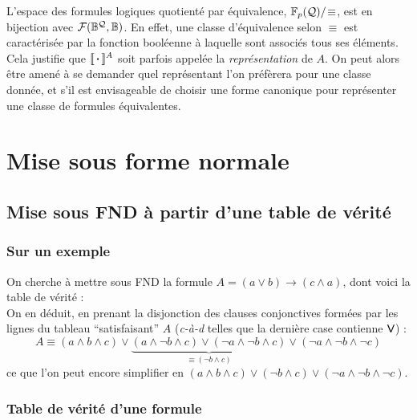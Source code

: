		L'espace des formules logiques quotienté par équivalence, \(\FpQ/\!\equiv\), est en bijection avec \(\cal{F}(\bb{B}^\cal{Q},\bb{B})\). En effet, une classe d'équivalence selon \(\equiv\) est caractérisée par la fonction booléenne à laquelle sont associés tous ses éléments.
			\nt
		Cela justifie que \(\llbracket \text{\! \bdot \!} \rrbracket^A\) soit parfois appelée la \emph{représentation} de \(A\).
			\nll
		On peut alors être amené à se demander quel représentant l'on préfèrera pour une classe donnée, et s'il est envisageable de choisir une forme canonique pour représenter une classe de formules équivalentes.
		
\section{Mise sous forme normale}

	\subsection{Mise sous FND à partir d'une table de vérité}
	
		\subsubsection{Sur un exemple}
			
			\eqskip{2mm}
			On cherche à mettre sous FND la formule \(A = (a \vee b) \rightarrow (c \wedge a)\), dont voici la table de vérité : \\[60mm]
			On en déduit, en prenant la disjonction des clauses conjonctives formées par les lignes du tableau ``satisfaisant'' \(A\) (\emph{c-à-d} telles que la dernière case contienne \(\V\)) :
				\[
					A \equiv (a \wedge b \wedge c) \vee \underbrace{(a \wedge \neg b \wedge c) \vee (\neg a \wedge \neg b \wedge c)}_{\equiv (\neg b \wedge c)} \vee (\neg a \wedge \neg b \wedge \neg c)
				\]
			ce que l'on peut encore simplifier en \((a \wedge b \wedge c) \vee (\neg b \wedge c) \vee (\neg a \wedge \neg b \wedge \neg c)\).
			
		\subsubsection{Table de vérité d'une formule}
		
			
